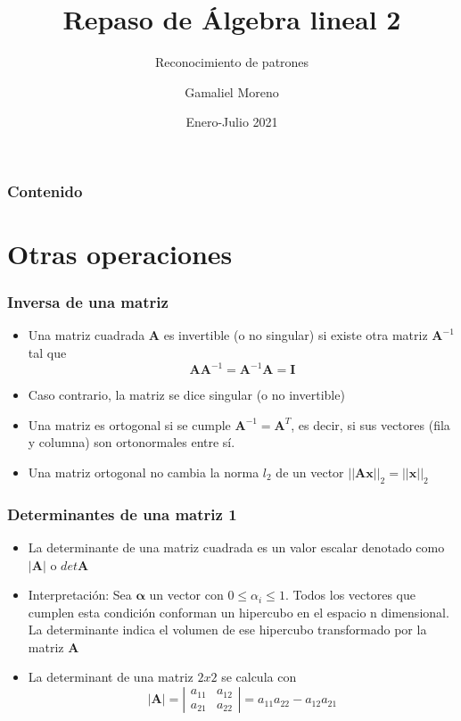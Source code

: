 \documentclass{beamer}
\title{Repaso de Álgebra lineal 2}
\subtitle{Reconocimiento de patrones}
\author{Gamaliel Moreno}
\date{Enero-Julio 2021}
\institute{\url{gamalielmch@uaz.edu.mx}\\\url{http://pds.uaz.edu.mx/}}
\begin{document}
\begin{frame}[plain,t]
\titlepage
\end{frame}

\begin{frame}%
	\frametitle{Contenido}
\tableofcontents
\end{frame}


\section{Otras operaciones}

\begin{frame}
\frametitle{Inversa de una matriz}
 \begin{itemize}
 \item Una matriz cuadrada $\boldsymbol{A}$ es invertible (o no singular) si existe otra matriz $\boldsymbol{A}^{-1}$ tal que 
 \begin{equation*}
\boldsymbol{AA}^{-1} = \boldsymbol{A}^{-1}\boldsymbol{A}= \boldsymbol{I}
\end{equation*}
\item Caso contrario, la matriz se dice singular (o no invertible)
\item Una matriz es ortogonal si se cumple $\boldsymbol{A}^{-1}= \boldsymbol{A}^{T}$, es decir, si sus vectores (fila y columna) son ortonormales entre sí.
\item Una matriz ortogonal no cambia la norma $l_2$ de un vector $\vert \vert \boldsymbol{Ax}\vert \vert_{2}= \vert \vert \boldsymbol{x}\vert \vert_{2}$  
 \end{itemize}

\end{frame}
\begin{frame}
\frametitle{Determinantes de una matriz 1}

\begin{itemize}
\item La determinante de una matriz cuadrada es un valor escalar denotado como $\vert \boldsymbol{A}\vert$ o $ det\boldsymbol{ A}$
\item Interpretación: Sea $\boldsymbol{\alpha}$ un vector con $0\leq \alpha_{i} \leq 1$. Todos los vectores que cumplen esta condición conforman un hipercubo en el espacio n dimensional. La determinante indica el volumen de ese hipercubo transformado por la matriz $\boldsymbol{A}$ 
\item La determinant de una matriz $2x2$ se calcula con 
\begin{equation*}
\vert \boldsymbol{A} \vert = \left| \begin{array}{cc} a_{11} &  a_{12} \\ a_{21} &  a_{22}  \end{array} \right|= a_{11}a_{22} -   a_{12}a_{21}
\end{equation*}
\end{itemize}
\end{frame}
\end{document}
